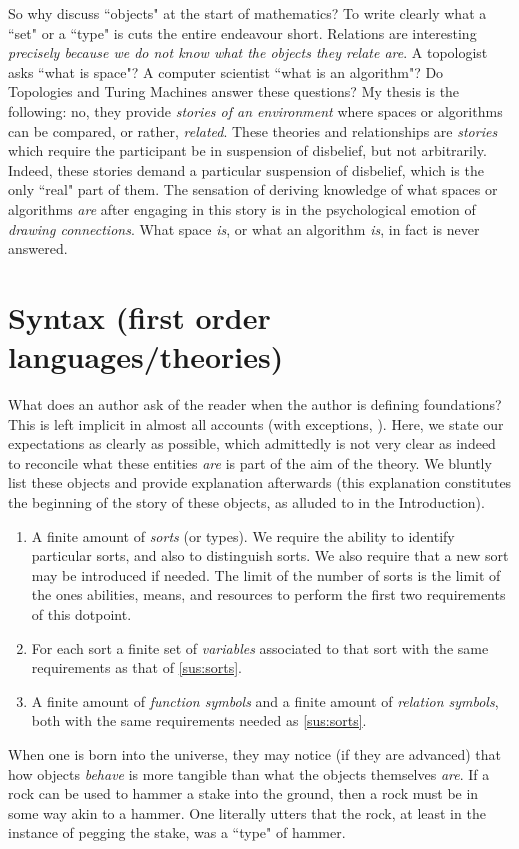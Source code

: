\documentclass[12pt]{article}
\theoremstyle{plain}
\theoremstyle{definition}
\begin{document}
	So why discuss ``objects" at the start of mathematics? To write clearly what a ``set" or a ``type" is cuts the entire endeavour short. Relations are interesting \emph{precisely because we do not know what the objects they relate are}. A topologist asks ``what is space"? A computer scientist ``what is an algorithm"? Do Topologies and Turing Machines answer these questions? My thesis is the following: no, they provide \emph{stories of an environment} where spaces or algorithms can be compared, or rather, \emph{related}. These theories and relationships are \emph{stories} which require the participant be in suspension of disbelief, but not arbitrarily. Indeed, these stories demand a particular suspension of disbelief, which is the only ``real" part of them. The sensation of deriving knowledge of what spaces or algorithms \emph{are} after engaging in this story is in the psychological emotion of \emph{drawing connections}. What space \emph{is}, or what an algorithm \emph{is}, in fact is never answered.
	\section{Syntax (first order languages/theories)}
	What does an author ask of the reader when the author is defining foundations? This is left implicit in almost all accounts (with exceptions, \cite{Murf_Cat}). Here, we state our expectations as clearly as possible, which admittedly is not very clear as indeed to reconcile what these entities \emph{are} is part of the aim of the theory. We bluntly list these objects and provide explanation afterwards (this explanation constitutes the beginning of the story of these objects, as alluded to in the Introduction).
	\begin{enumerate}
		\item\label{sus:sorts} A finite amount of \emph{sorts} (or types). We require the ability to identify particular sorts, and also to distinguish sorts. We also require that a new sort may be introduced if needed. The limit of the number of sorts is the limit of the ones abilities, means, and resources to perform the first two requirements of this dotpoint.
		\item For each sort a finite set of \emph{variables} associated to that sort with the same requirements as that of \ref{sus:sorts}.
		\item A finite amount of \emph{function symbols} and a finite amount of \emph{relation symbols}, both with the same requirements needed as \ref{sus:sorts}.
	\end{enumerate}
	When one is born into the universe, they may notice (if they are advanced) that how objects \emph{behave} is more tangible than what the objects themselves \emph{are}. If a rock can be used to hammer a stake into the ground, then a rock must be in some way akin to a hammer. One literally utters that the rock, at least in the instance of pegging the stake, was a ``type" of hammer.
	
\end{document}
